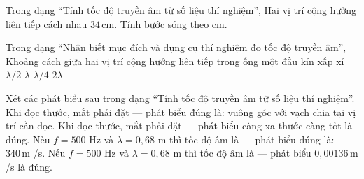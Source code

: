 \begin{ex}
Trong dạng “Tính tốc độ truyền âm từ số liệu thí nghiệm”, Hai vị trí cộng hưởng liên tiếp cách nhau $34\,\text{cm}$. Tính bước sóng theo cm.
\end{ex}

\begin{ex}
Trong dạng “Nhận biết mục đích và dụng cụ thí nghiệm đo tốc độ truyền âm”, Khoảng cách giữa hai vị trí cộng hưởng liên tiếp trong ống một đầu kín xấp xỉ
\choice
{\True $\lambda/2$}
{$\lambda$}
{$\lambda/4$}
{$2\lambda$}
\end{ex}

\begin{ex}
Xét các phát biểu sau trong dạng “Tính tốc độ truyền âm từ số liệu thí nghiệm”.
\choiceTF
{\True Khi đọc thước, mắt phải đặt — phát biểu đúng là: vuông góc với vạch chia tại vị trí cần đọc.}
{Khi đọc thước, mắt phải đặt — phát biểu càng xa thước càng tốt là đúng.}
{\True Nếu $f=500$ Hz và $\lambda=0,68$ m thì tốc độ âm là — phát biểu đúng là: $340\,\text{m}$ /s.}
{Nếu $f=500$ Hz và $\lambda=0,68$ m thì tốc độ âm là — phát biểu $0,00136\,\text{m}$ /s là đúng.}
\end{ex}

